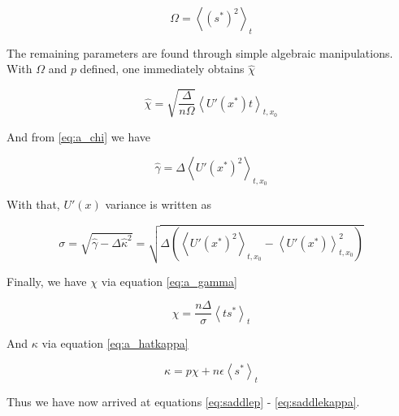 \begin{equation}
  \label{eq:a_57}
\Omega = \left\langle (s^*)^2 \right\rangle_t
\end{equation}

The remaining parameters are found through simple algebraic manipulations. With $\Omega$ and $p$ defined, one immediately obtains $\hat{\chi}$

\begin{equation}
  \label{eq:a_58}
\hat{\chi} = \sqrt{\frac{\Delta}{n\Omega}} \left \langle U'(x^*) t
\right \rangle_{t,x_0}
\end{equation}

And from \eqref{eq:a_chi} we have

 \begin{equation}
  \label{eq:a_59}
\hat{\gamma} =
\Delta \left \langle U'(x^*)^2 \right \rangle_{t,x_0}
\end{equation}

With that, $U'(x)$ variance is written as

\begin{equation}
  \label{eq:a_60}
\sigma = \sqrt{\hat{\gamma} - \Delta \hat{\kappa}^2} = \sqrt{\Delta
    \left(\left \langle U'(x^*)^2 \right \rangle_{t,x_0} - \left
        \langle U'(x^*) \right \rangle_{t,x_0}^2 \right)}
\end{equation}

Finally, we have $\chi$ via equation \eqref{eq:a_gamma}

  \begin{equation}
    \label{eq:a_61}
    \chi = \frac{n\Delta}{\sigma} \left \langle t s^* \right \rangle_t
  \end{equation}

And $\kappa$ via equation \eqref{eq:a_hatkappa}

\begin{equation}
  \label{eq:a_62}
  \kappa = p \chi + n\epsilon \left \langle s^* \right \rangle_t
\end{equation}

Thus we have now arrived at equations \eqref{eq:saddlep} - \eqref{eq:saddlekappa}.
